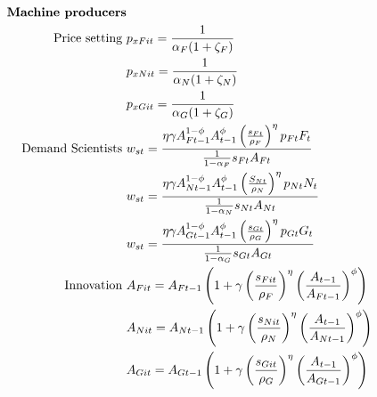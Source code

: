 \begin{align}
%
\text{\textbf{Machine producers}}\nonumber\\
\text{Price setting}\ \vspace{4mm}&p_{xFit}=\frac{1}{\alpha_F(1+\zeta_F)}\nonumber\\
&p_{xNit}=\frac{1}{\alpha_N(1+\zeta_N)}\nonumber\\
&p_{xGit}=\frac{1}{\alpha_G(1+\zeta_G)}
\nonumber\\ 
\text{Demand Scientists}\ \vspace{4mm}&
w_{st}=\frac{\eta \gamma A_{Ft-1}^{1-\phi}A_{t-1}^{\phi}\left(\frac{s_{Ft}}{\rho_F}\right)^{\eta}p_{Ft}F_t}{\frac{1}{1-\alpha_F}s_{Ft}A_{Ft}}\nonumber\\
&
w_{st}=\frac{\eta \gamma  A_{Nt-1}^{1-\phi}A_{t-1}^{\phi}\left(\frac{S_{Nt}}{\rho_N}\right)^{\eta}p_{Nt}N_t}{\frac{1}{1-\alpha_N}s_{Nt}A_{Nt}}\nonumber\\
&
w_{st}=\frac{\eta \gamma  A_{Gt-1}^{1-\phi}A_{t-1}^{\phi}\left(\frac{s_{Gt}}{\rho_G}\right)^{\eta}p_{Gt}G_t}{\frac{1}{1-\alpha_G}s_{Gt}A_{Gt}}\nonumber\\
\text{Innovation}\ \vspace{4mm}&
A_{Fit}=A_{Ft-1}\left(1+\gamma\left(\frac{s_{Fit}}{\rho_F}\right)^{\eta}\left(\frac{A_{t-1}}{A_{Ft-1}}\right)^{\phi}\right)\nonumber \\
&
A_{Nit}=A_{Nt-1}\left(1+\gamma\left(\frac{s_{Nit}}{\rho_N}\right)^{\eta}\left(\frac{A_{t-1}}{A_{Nt-1}}\right)^{\phi}\right)\nonumber \\
&
A_{Git}=A_{Gt-1}\left(1+\gamma\left(\frac{s_{Git}}{\rho_G}\right)^{\eta}\left(\frac{A_{t-1}}{A_{Gt-1}}\right)^{\phi}\right)\nonumber \\

\end{align}
